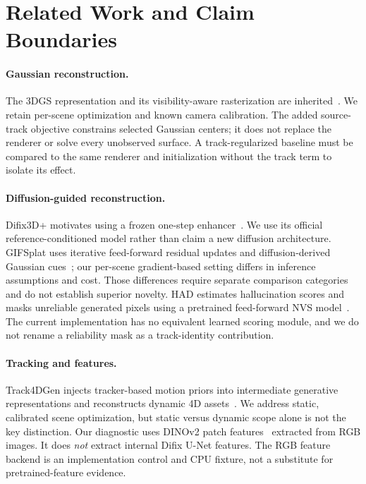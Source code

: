 \documentclass[10pt,twocolumn,letterpaper]{article}
\begin{document}
\section{Related Work and Claim Boundaries}
\paragraph{Gaussian reconstruction.} The 3DGS representation and its visibility-aware rasterization are inherited~\citep{kerbl2023gaussians}. We retain per-scene optimization and known camera calibration. The added source-track objective constrains selected Gaussian centers; it does not replace the renderer or solve every unobserved surface. A track-regularized baseline must be compared to the same renderer and initialization without the track term to isolate its effect.

\paragraph{Diffusion-guided reconstruction.} Difix3D+ motivates using a frozen one-step enhancer~\citep{wu2025difix}. We use its official reference-conditioned model rather than claim a new diffusion architecture. GIFSplat uses iterative feed-forward residual updates and diffusion-derived Gaussian cues~\citep{chen2026gifsplat}; our per-scene gradient-based setting differs in inference assumptions and cost. Those differences require separate comparison categories and do not establish superior novelty. HAD estimates hallucination scores and masks unreliable generated pixels using a pretrained feed-forward NVS model~\citep{liu2026had}. The current implementation has no equivalent learned scoring module, and we do not rename a reliability mask as a track-identity contribution.

\paragraph{Tracking and features.} Track4DGen injects tracker-based motion priors into intermediate generative representations and reconstructs dynamic 4D assets~\citep{sun2025track4dgen}. We address static, calibrated scene optimization, but static versus dynamic scope alone is not the key distinction. Our diagnostic uses DINOv2 patch features~\citep{oquab2023dinov2} extracted from RGB images. It does \emph{not} extract internal Difix U-Net features. The RGB feature backend is an implementation control and CPU fixture, not a substitute for pretrained-feature evidence.
\end{document}

